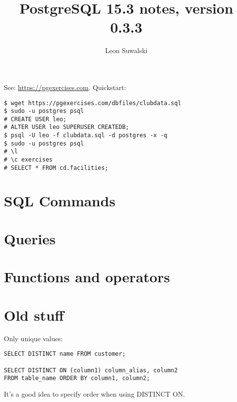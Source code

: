 \documentclass{charun}
\title{PostgreSQL 15.3 notes, version 0.3.3}
\author{Leon Suwalski}
\begin{document}
\begin{multicols*}{2}
\maketitle
\raggedright

See: \url{https://pgexercises.com}.
Quickstart:
\begin{verbatim}
$ wget https://pgexercises.com/dbfiles/clubdata.sql
$ sudo -u postgres psql
# CREATE USER leo;
# ALTER USER leo SUPERUSER CREATEDB;
$ psql -U leo -f clubdata.sql -d postgres -x -q
$ sudo -u postgres psql
# \l
# \c exercises
# SELECT * FROM cd.facilities;
\end{verbatim}

\section{SQL Commands}


\section{Queries}


\section{Functions and operators}








\newpage
\section{Old stuff}
Only unique values:
\begin{verbatim}
SELECT DISTINCT name FROM customer;

SELECT DISTINCT ON (column1) column_alias, column2
FROM table_name ORDER BY column1, column2;
\end{verbatim}

It's a good idea to specify order when using DISTINCT ON.


\end{multicols*}
\end{document}
